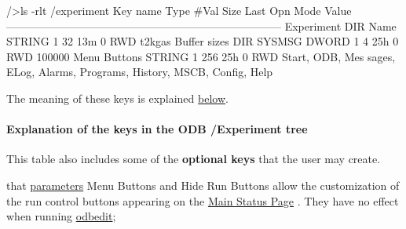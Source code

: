 \begin{DoxyCode}
/>ls -rlt /experiment
Key name                        Type    #Val  Size  Last Opn Mode Value
---------------------------------------------------------------------------
Experiment                      DIR
    Name                        STRING  1     32    13m  0   RWD  t2kgas
    Buffer sizes                DIR
        SYSMSG                  DWORD   1     4     25h  0   RWD  100000
    Menu Buttons                STRING  1     256   25h  0   RWD  Start, ODB, Mes
      sages, ELog, Alarms, Programs, History, MSCB, Config, Help
\end{DoxyCode}


The meaning of these keys is explained \hyperlink{RC_customize_ODB_RC_Experiment_tree_keys}{below}.

\par
 \hypertarget{RC_customize_ODB_RC_Experiment_tree_keys}{}\paragraph{Explanation of the keys in the ODB /Experiment tree}\label{RC_customize_ODB_RC_Experiment_tree_keys}
\label{RC_customize_ODB_RC_customize_mhttpd_run_buttons}
\hypertarget{RC_customize_ODB_RC_customize_mhttpd_run_buttons}{}
 This table also includes some of the {\bfseries optional keys} that the user may create.

that \hyperlink{structparameters}{parameters} Menu Buttons and Hide Run Buttons allow the customization of the run control buttons appearing on the \hyperlink{RC_mhttpd_Main_Status_page}{Main Status Page} . They have no effect when running \hyperlink{RC_odbedit_utility}{odbedit};

